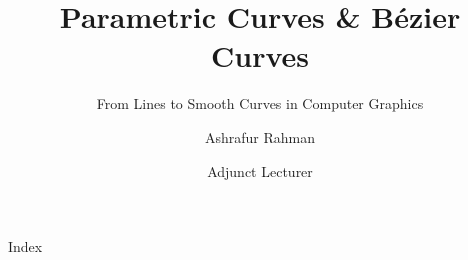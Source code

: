 

\title{Parametric Curves \& Bézier Curves}
\subtitle{From Lines to Smooth Curves in Computer Graphics}
\author{\large Ashrafur Rahman}
\date{\small Adjunct Lecturer}



\begin{frame}
  \titlepage
\end{frame}

\begin{frame}{Index}
  \footnotesize
  \vspace{1cm}
  \tableofcontents
\end{frame}















